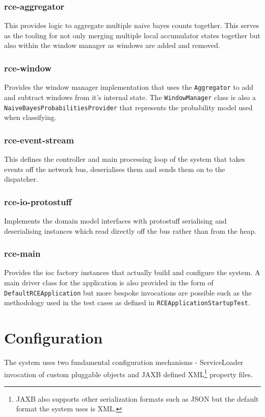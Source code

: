 \documentclass[a4paper,11pt]{scrreprt}
\begin{document}
\subsubsection{rce-aggregator}
This provides logic to aggregate multiple naive bayes counts together. This serves as the tooling for not only merging multiple local accumulator states together but also within the window manager as windows are added and removed.

\subsubsection{rce-window}
Provides the window manager implementation that uses the \verb|Aggregator| to add and subtract windows from it's internal state. The \verb|WindowManager| class is also a\\ \verb|NaiveBayesProbabilitiesProvider| that represents the probability model used when classifying.

\subsubsection{rce-event-stream}
This defines the controller and main processing loop of the system that takes events off the network bus, deserialises them and sends them on to the dispatcher.

\subsubsection{rce-io-protostuff}
Implements the domain model interfaces with protostuff serialising and deserialising instances which read directly off the bus rather than from the heap.

\subsubsection{rce-main}
Provides the \acrshort{ioc} factory instances that actually build and configure the system. A main driver class for the application is also provided in the form of \verb|DefaultRCEApplication| but more bespoke invocations are possible such as the methodology used in the test cases as defined in \verb|RCEApplicationStartupTest|.

\section{Configuration}
The system uses two fundamental configuration mechanisms - ServiceLoader invocation of custom pluggable objects and JAXB defined XML\footnote{JAXB also supports other serialization formats such as JSON but the default format the system uses is XML.} property files.
\end{document}
